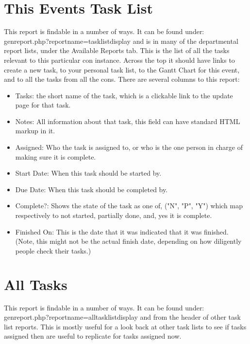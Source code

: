 \documentclass[captions=tablesignature]{scrartcl}
\begin{document}
\section{This Events Task List}
\label{sec-3}
This report is findable in a number of ways.  It can be found under:
genreport.php?reportname=tasklistdisplay
and is in many of the departmental report lists, under the Available
Reports tab.  This is the list of all the tasks relevant to this
particular con instance.  Across the top it should have links to
create a new task, to your personal task list, to the Gantt Chart
for this event, and to all the tasks from all the cons.  There are
several columns to this report:
\begin{itemize}
\item Tasks: the short name of the task, which is a clickable link to
the update page for that task.
\item Notes: All information about that task, this field can have
standard HTML markup in it.
\item Assigned: Who the task is assigned to, or who is the one person in
charge of making sure it is complete.
\item Start Date: When this task should be started by.
\item Due Date: When this task should be completed by.
\item Complete?: Shows the state of the task as one of, ("N", "P", "Y")
which map respectively to not started, partially done, and, yes it
is complete.
\item Finished On: This is the date that it was indicated that it was
finished. (Note, this might not be the actual finish date,
depending on how diligently people check their tasks.)
\end{itemize}

\section{All Tasks}
\label{sec-4}
This report is findable in a number of ways.  It can be found under:
genreport.php?reportname=alltasklistdisplay
and from the header of other task list reports.  This is mostly
useful for a look back at other task lists to see if tasks assigned
then are useful to replicate for tasks assigned now.
\end{document}
